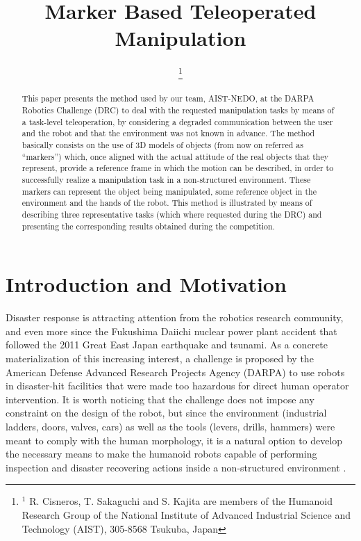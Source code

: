 \documentclass[letterpaper, 10 pt, conference]{ieeeconf}
\begin{document}
	\title{\LARGE \bf Marker Based Teleoperated Manipulation}

	\author{
		\and
		\and
		\thanks{$^{1}$ R. Cisneros, T. Sakaguchi and S. Kajita are members of the
						Humanoid Research Group of the National Institute of Advanced Industrial Science
						and Technology (AIST), 305-8568 Tsukuba, Japan}}
  
	\maketitle

	\thispagestyle{empty}
	\pagestyle{empty}

	\begin{abstract}
		This paper presents the method used by our team, AIST-NEDO, at the DARPA Robotics Challenge (DRC) to deal with
		the requested manipulation tasks by means of a task-level teleoperation, by considering a degraded communication
		between the user and the robot and that the environment was not known in advance.
		The method basically consists on the use of 3D models of objects (from now on referred as ``markers'') which,
		once aligned with the actual attitude of the real objects that they represent, provide a reference frame in
		which the motion can be described, in order to successfully realize a manipulation task in a non-structured
		environment.
		These markers can represent the object being manipulated, some reference object in the environment and the
		hands of the robot.
		This method is illustrated by means of describing three representative tasks (which where requested during the DRC)
		and presenting the corresponding results obtained during the competition.
	\end{abstract}
	
	\section{Introduction and Motivation}
	
		Disaster response is attracting attention from the robotics research community, and even more since the
		Fukushima Daiichi nuclear power plant accident that followed the 2011 Great East Japan earthquake and tsunami.
		As a concrete materialization of this increasing interest, a challenge is proposed by the American Defense
		Advanced Research Projects Agency (DARPA) to use robots in disaster-hit facilities that were made too hazardous
		for direct human operator intervention.
		It is worth noticing that the challenge does not impose any constraint on the design of the robot, but since the
		environment (industrial ladders, doors, valves, cars) as well as the tools (levers, drills, hammers) were meant
		to comply with the human morphology, it is a natural option to develop the necessary means to make the humanoid
		robots capable of performing inspection and disaster recovering actions inside a non-structured environment
		\cite{Bouyarmane}.
		
\end{document}
